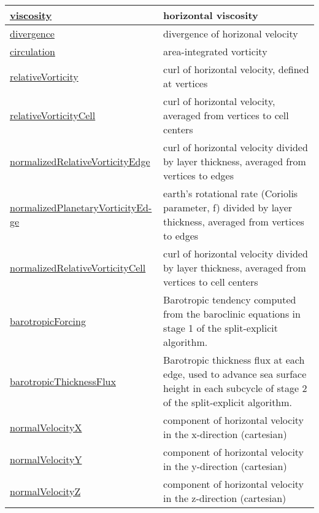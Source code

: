 {\begin{center}
\begin{longtable}{| p{2.0in} | p{4.0in} |}
	\hyperref[subsec:var_sec_diagnostics_viscosity]{viscosity} & horizontal viscosity \\
	\hline
	\hyperref[subsec:var_sec_diagnostics_divergence]{divergence} & divergence of horizonal velocity \\
	\hline
	\hyperref[subsec:var_sec_diagnostics_circulation]{circulation} & area-integrated vorticity \\
	\hline
	\hyperref[subsec:var_sec_diagnostics_relativeVorticity]{relativeVorticity} & curl of horizontal velocity, defined at vertices \\
	\hline
	\hyperref[subsec:var_sec_diagnostics_relativeVorticityCell]{relativeVorticityCell} & curl of horizontal velocity, averaged from vertices to cell centers \\
	\hline
	\hyperref[subsec:var_sec_diagnostics_normalizedRelativeVorticityEdge]{normalizedRelativeVorticityEdge} & curl of horizontal velocity divided by layer thickness, averaged from vertices to edges \\
	\hline
	\hyperref[subsec:var_sec_diagnostics_normalizedPlanetaryVorticityEdge]{normalizedPlanetaryVorticityEd-}\hyperref[subsec:var_sec_diagnostics_normalizedPlanetaryVorticityEdge]{ge  }& earth's rotational rate (Coriolis parameter, f) divided by layer thickness, averaged from vertices to edges \\
	\hline
	\hyperref[subsec:var_sec_diagnostics_normalizedRelativeVorticityCell]{normalizedRelativeVorticityCell} & curl of horizontal velocity divided by layer thickness, averaged from vertices to cell centers \\
	\hline
	\hyperref[subsec:var_sec_diagnostics_barotropicForcing]{barotropicForcing} & Barotropic tendency computed from the baroclinic equations in stage 1 of the split-explicit algorithm. \\
	\hline
	\hyperref[subsec:var_sec_diagnostics_barotropicThicknessFlux]{barotropicThicknessFlux} & Barotropic thickness flux at each edge, used to advance sea surface height in each subcycle of stage 2 of the split-explicit algorithm. \\
	\hline
	\hyperref[subsec:var_sec_diagnostics_normalVelocityX]{normalVelocityX} & component of horizontal velocity in the x-direction (cartesian) \\
	\hline
	\hyperref[subsec:var_sec_diagnostics_normalVelocityY]{normalVelocityY} & component of horizontal velocity in the y-direction (cartesian) \\
	\hline
	\hyperref[subsec:var_sec_diagnostics_normalVelocityZ]{normalVelocityZ} & component of horizontal velocity in the z-direction (cartesian) \\

\end{longtable}
\end{center}}
